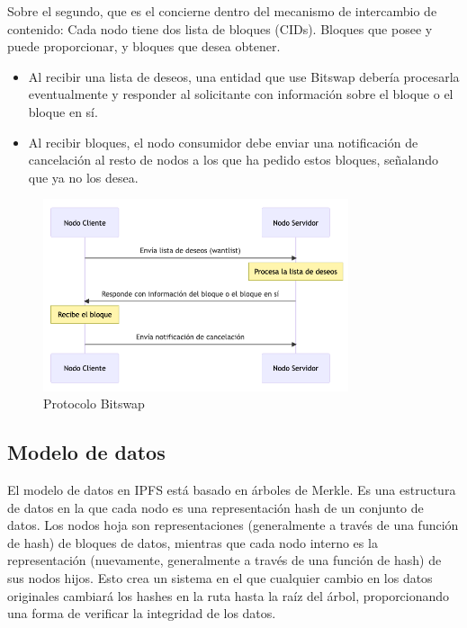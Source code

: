 Sobre el segundo, que es el concierne dentro del mecanismo de intercambio de contenido: Cada nodo tiene dos lista de bloques (CIDs). Bloques que posee y puede
proporcionar, y bloques que desea obtener.
\begin{itemize}[itemsep=1pt]
      \item Al recibir una lista de deseos, una entidad que use Bitswap debería procesarla eventualmente y responder al solicitante con información sobre el bloque o el bloque en sí.
      \item Al recibir bloques, el nodo consumidor debe enviar una notificación de cancelación al resto de nodos a los que ha pedido estos bloques, señalando que  ya no los desea.
\end{itemize}


\begin{figure}[H]
      \centering
      \includegraphics[width=0.8\textwidth]{images/bitswap.png}
      \caption{Protocolo Bitswap}
      \label{bitswap}
\end{figure}


\subsection{Modelo de datos}

El modelo de datos en IPFS está basado en árboles de Merkle. Es una estructura de datos en la que cada nodo es una representación hash de un conjunto de datos.
Los nodos hoja son representaciones (generalmente a través de una función de hash) de bloques de datos, mientras que cada nodo interno es la representación
(nuevamente, generalmente a través de una función de hash) de sus nodos hijos. Esto crea un sistema en el que cualquier cambio en los datos originales cambiará
los hashes en la ruta hasta la raíz del árbol, proporcionando una forma de verificar la integridad de los datos.

